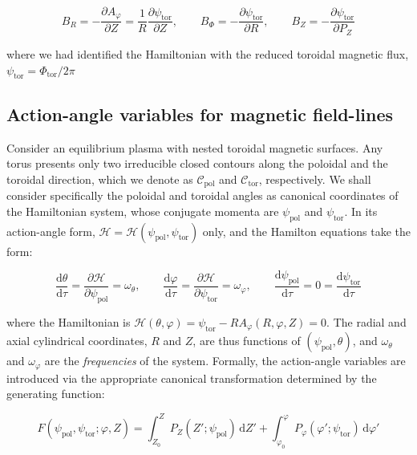 \begin{equation}
    \label{eq-5-201}
    B_R=-\frac{\partial A_\varphi}{\partial Z}=\frac{1}{R}\frac{\partial\psi_\text{tor}}{\partial Z},\qquad B_\Phi=-\frac{\partial\psi_\text{tor}}{\partial R},\qquad B_Z=-\frac{\partial\psi_\text{tor}}{\partial P_Z}
\end{equation}

where we had identified the Hamiltonian with the reduced toroidal magnetic flux, $\psi_\text{tor}=\Phi_\text{tor}/2\pi$

\subsection{Action-angle variables for magnetic field-lines}

Consider an equilibrium plasma with nested toroidal magnetic surfaces. Any torus presents only two irreducible closed contours along the poloidal and the toroidal direction, which we denote as $\mathcal{C}_\text{pol}$ and $\mathcal{C}_\text{tor}$, respectively. We shall consider specifically the poloidal and toroidal angles as canonical coordinates of the Hamiltonian system, whose conjugate momenta are $\psi_\text{pol}$ and $\psi_\text{tor}$. In its action-angle form, $\mathcal{H}=\mathcal{H}(\psi_\text{pol},\psi_\text{tor})$ only, and the Hamilton equations take the form:

\begin{equation}
    \frac{\mathrm{d}\theta}{\mathrm{d}\tau}=\frac{\partial\mathcal{H}}{\partial\psi_\text{pol}}=\omega_\theta,\qquad\frac{\mathrm{d}\varphi}{\mathrm{d}\tau}=\frac{\partial\mathcal{H}}{\partial\psi_\text{tor}}=\omega_\varphi,\qquad\frac{\mathrm{d}\psi_\text{pol}}{\mathrm{d}\tau}=0=\frac{\mathrm{d}\psi_\text{tor}}{\mathrm{d}\tau}
\end{equation}

where the Hamiltonian is $\mathcal{H}(\theta,\varphi)=\psi_\text{tor}-RA_\varphi(R,\varphi,Z)=0$. The radial and axial cylindrical coordinates, $R$ and $Z$, are thus functions of $(\psi_\text{pol},\theta)$, and $\omega_\theta$ and $\omega_\varphi$ are the \textit{frequencies} of the system. Formally, the action-angle variables are introduced via the appropriate canonical transformation determined by the generating function:

\begin{equation}
    \label{eq-x-8-2}
    F(\psi_\text{pol},\psi_\text{tor};\varphi,Z)=\int_{Z_0}^ZP_Z(Z';\psi_\text{pol})\,\text{d}Z'+\int_{\varphi_0}^\varphi P_\varphi(\varphi';\psi_\text{tor})\,\text{d}\varphi'
\end{equation}

